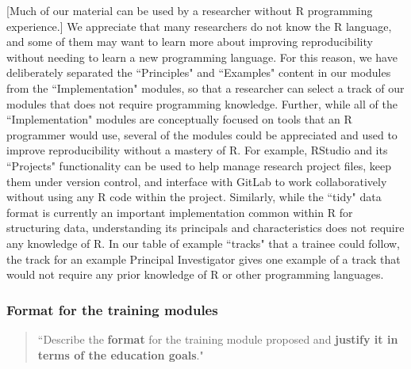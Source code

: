 \documentclass[pdftex,english,11pt,parskip=half]{scrartcl}
\begin{document}
[Much of our material can be used by a researcher without R programming
experience.] We appreciate that many researchers do not know the R language, and
some of them may want to learn more about improving reproducibility without
needing to learn a new programming language. For this reason, we have
deliberately separated the ``Principles" and ``Examples" content in our modules
from the ``Implementation" modules, so that a researcher can select a track of
our modules that does not require programming knowledge. Further, while all of
the ``Implementation" modules are conceptually focused on tools that an R
programmer would use, several of the modules could be appreciated and used to
improve reproducibility without a mastery of R. For example, RStudio and its
``Projects" functionality can be used to help manage research project files,
keep them under version control, and interface with GitLab to work
collaboratively without using any R code within the project. Similarly, while
the ``tidy" data format is currently an important implementation common within R
for structuring data, understanding its principals and characteristics does not
require any knowledge of R. In our table of example ``tracks" that a trainee
could follow, the track for an example Principal Investigator gives one example
of a track that would not require any prior knowledge of R or other programming
languages.   







\subsubsection*{Format for the training modules}

\begin{quotation} ``Describe the \textbf{format} for the training module
proposed and \textbf{justify it in terms of the education goals}."
\end{quotation}
\end{document}
